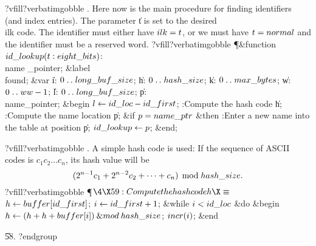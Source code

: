 \fi
?vfill?verbatimgobble
. Here now is the main procedure for finding identifiers (and index
entries).  The parameter \|t is set to the desired \\{ilk} code. The
identifier must either have $\\{ilk}=\|t$, or we must have
$\|t=\\{normal}$ and the identifier must be a reserved word.
?vfill?verbatimgobble
\Y\P\4\&{function}\1\  $\\{id\_lookup}(\|t:\\{eight\_bits})$: \\{name%
\_pointer};\6
\4\&{label} \\{found};\6
\4\&{var} \|i: $0\to\\{long\_buf\_size}$;\6
\|h: $0\to\\{hash\_size}$;\6
\|k: $0\to\\{max\_bytes}$;\6
\|w: $0\to\\{ww}-1$;\6
\|l: $0\to\\{long\_buf\_size}$;\6
\|p: \\{name\_pointer};\2\6
\&{begin} $\|l\K\\{id\_loc}-\\{id\_first}$;\6
:Compute the hash code \|h\X;\6
:Compute the name location \|p\X;\6
\&{if} $\|p=\\{name\_ptr}$ \1\&{then}\5
:Enter a new name into the table at position \|p\X;\2\6
$\\{id\_lookup}\K\|p$;\6
\&{end};\par
\fi
?vfill?verbatimgobble
. A simple hash code is used: If the sequence of
ASCII codes is $c_1c_2\ldots c_n$, its hash value will be
$$(2^{n-1}c_1+2^{n-2}c_2+\cdots+c_n)\,\bmod\,\\{hash\_size}.$$
?vfill?verbatimgobble
\Y\P$\4\X59:Compute the hash code \|h\X\S$\6
$\|h\K\\{buffer}[\\{id\_first}]$;\5
$\|i\K\\{id\_first}+1$;\6
\&{while} $\|i<\\{id\_loc}$ \1\&{do}\6
\&{begin} $\|h\K(\|h+\|h+\\{buffer}[\|i])\mathbin{\&{mod}}\\{hash\_size}$;\5
$\\{incr}(\|i)$;\6
\&{end}\2\par
\U58.\fi
?endgroup
\endgroup
\eject
\def\runninghead{APPENDIX C --- TRANSLATION BY {\tentt TANGLE}}
